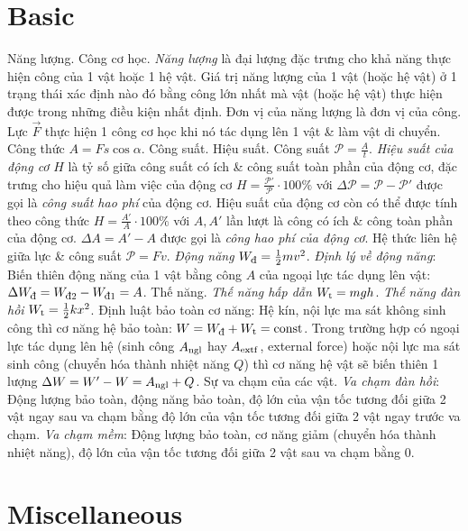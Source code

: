 \documentclass{article}
\begin{document}
\section{Basic}
 {\sf Năng lượng. Công cơ học.} {\it Năng lượng} là đại lượng đặc trưng cho khả năng thực hiện công của 1 vật hoặc 1 hệ vật. Giá trị năng lượng của 1 vật (hoặc hệ vật) ở 1 trạng thái xác định nào đó bằng công lớn nhất mà vật (hoặc hệ vật) thực hiện được trong những điều kiện nhất định. Đơn vị của năng lượng là đơn vị của công. Lực $\vec{F}$ thực hiện 1 công cơ học khi nó tác dụng lên 1 vật \& làm vật di chuyển. Công thức $A = Fs\cos\alpha$.  {\sf Công suất. Hiệu suất.} Công suất $\mathcal{P} = \frac{A}{t}$. {\it Hiệu suất của động cơ} $H$ là tỷ số giữa công suất có ích \& công suất toàn phần của động cơ, đặc trưng cho hiệu quả làm việc của động cơ $H = \frac{\mathcal{P}'}{\mathcal{P}}\cdot100\%$ với $\Delta\mathcal{P} = \mathcal{P} - \mathcal{P}'$ được gọi là {\it công suất hao phí} của động cơ. Hiệu suất của động cơ còn có thể được tính theo công thức $H = \frac{A'}{A}\cdot100\%$ với $A,A'$ lần lượt là công có ích \& công toàn phần của động cơ. $\Delta A = A' - A$ được gọi là {\it công hao phí của động cơ}. Hệ thức liên hệ giữa lực \& công suất $\mathcal{P} = Fv$.  {\it Động năng} $W_{\footnotesize\mbox{\rm đ}} = \frac{1}{2}mv^2$. {\it Định lý về động năng}: Biến thiên động năng của 1 vật bằng công $A$ của ngoại lực tác dụng lên vật: $\Delta W_{\footnotesize\mbox{\rm đ}} = W_{\footnotesize\mbox{\rm đ}2} - W_{\footnotesize\mbox{\rm đ}1} = A$.  {\sf Thế năng.} {\it Thế năng hấp dẫn} $W_{\rm t} = mgh$. {\it Thế năng đàn hồi} $W_{\rm t} = \frac{1}{2}kx^2$.  {\sf Định luật bảo toàn cơ năng}: Hệ kín, nội lực ma sát không sinh công thì cơ năng hệ bảo toàn: $W = W_{\footnotesize\mbox{\rm đ}} + W_{\rm t} = {\rm const}$. Trong trường hợp có ngoại lực tác dụng lên hệ (sinh công $A_{\rm ngl}$ hay $A_{\rm extf}$, external force) hoặc nội lực ma sát sinh công (chuyển hóa thành nhiệt năng $Q$) thì cơ năng hệ vật sẽ biến thiên 1 lượng $\Delta W = W' - W = A_{\rm ngl} + Q$. {} {\sf Sự va chạm của các vật.} {\it Va chạm đàn hồi}: Động lượng bảo toàn, động năng bảo toàn, độ lớn của vận tốc tương đối giữa 2 vật ngay sau va chạm bằng độ lớn của vận tốc tương đối giữa 2 vật ngay trước va chạm. {\it Va chạm mềm}: Động lượng bảo toàn, cơ năng giảm (chuyển hóa thành nhiệt năng), độ lớn của vận tốc tương đối giữa 2 vật sau va chạm bằng $0$.


\section{Miscellaneous}


\printbibliography[heading=bibintoc]
	
\end{document}
